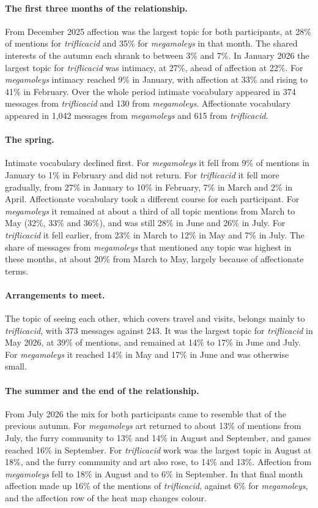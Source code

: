 \documentclass[11pt,a4paper]{article}
\newcommand{\userA}{\textit{triflicacid}}
\newcommand{\userB}{\textit{megamoleys}}
\begin{document}
\paragraph{The first three months of the relationship.}
From December 2025 affection was the largest topic for both participants, at 28\% of
mentions for \userA{} and 35\% for \userB{} in that month. The shared interests of the
autumn each shrank to between 3\% and 7\%. In January 2026 the largest topic for
\userA{} was intimacy, at 27\%, ahead of affection at 22\%. For \userB{} intimacy
reached 9\% in January, with affection at 33\% and rising to 41\% in February. Over
the whole period intimate vocabulary appeared in 374 messages from \userA{} and 130
from \userB{}. Affectionate vocabulary appeared in 1,042 messages from \userB{} and
615 from \userA{}.

\paragraph{The spring.}
Intimate vocabulary declined first. For \userB{} it fell from 9\% of mentions in
January to 1\% in February and did not return. For \userA{} it fell more gradually,
from 27\% in January to 10\% in February, 7\% in March and 2\% in April. Affectionate
vocabulary took a different course for each participant. For \userB{} it remained at
about a third of all topic mentions from March to May (32\%, 33\% and 36\%), and was
still 28\% in June and 26\% in July. For \userA{} it fell earlier, from 23\% in March
to 12\% in May and 7\% in July. The share of messages from \userB{} that mentioned
any topic was highest in these months, at about 20\% from March to May, largely
because of affectionate terms.

\paragraph{Arrangements to meet.}
The topic of seeing each other, which covers travel and visits, belongs mainly to
\userA{}, with 373 messages against 243. It was the largest topic for \userA{} in May
2026, at 39\% of mentions, and remained at 14\% to 17\% in June and July. For \userB{}
it reached 14\% in May and 17\% in June and was otherwise small.

\paragraph{The summer and the end of the relationship.}
From July 2026 the mix for both participants came to resemble that of the previous
autumn. For \userB{} art returned to about 13\% of mentions from July, the furry
community to 13\% and 14\% in August and September, and games reached 16\% in
September. For \userA{} work was the largest topic in August at 18\%, and the furry
community and art also rose, to 14\% and 13\%. Affection from \userB{} fell to 18\% in
August and to 6\% in September. In that final month affection made up 16\% of the
mentions of \userA{}, against 6\% for \userB{}, and the affection row of the heat map
changes colour.
\end{document}
